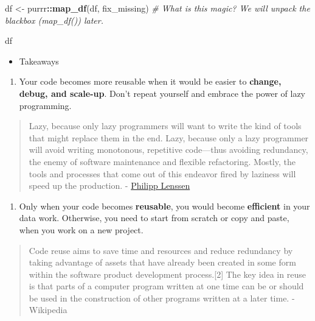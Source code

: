 \documentclass[
]{book}
\newenvironment{Shaded}{\begin{snugshade}}{\end{snugshade}}
\newcommand{\CommentTok}[1]{\textcolor[rgb]{0.56,0.35,0.01}{\textit{#1}}}
\newcommand{\FunctionTok}[1]{\textcolor[rgb]{0.13,0.29,0.53}{\textbf{#1}}}
\newcommand{\NormalTok}[1]{#1}
\newcommand{\OtherTok}[1]{\textcolor[rgb]{0.56,0.35,0.01}{#1}}
\newcommand{\SpecialCharTok}[1]{\textcolor[rgb]{0.81,0.36,0.00}{\textbf{#1}}}
\providecommand{\tightlist}{%
  \setlength{\itemsep}{0pt}\setlength{\parskip}{0pt}}
\begin{document}
\begin{Shaded}
\begin{Highlighting}[]
\NormalTok{df }\OtherTok{\textless{}{-}}\NormalTok{ purrr}\SpecialCharTok{::}\FunctionTok{map\_df}\NormalTok{(df, fix\_missing) }\CommentTok{\# What is this magic? We will unpack the blackbox (\textasciigrave{}map\_df()\textasciigrave{}) later.}

\NormalTok{df}
\end{Highlighting}
\end{Shaded}

\begin{itemize}
\tightlist
\item
  Takeaways
\end{itemize}

\begin{enumerate}
\def\labelenumi{\arabic{enumi}.}
\tightlist
\item
  Your code becomes more reusable when it would be easier to \textbf{change, debug, and scale-up}. Don't repeat yourself and embrace the power of lazy programming.
\end{enumerate}

\begin{quote}
Lazy, because only lazy programmers will want to write the kind of tools that might replace them in the end. Lazy, because only a lazy programmer will avoid writing monotonous, repetitive code---thus avoiding redundancy, the enemy of software maintenance and flexible refactoring. Mostly, the tools and processes that come out of this endeavor fired by laziness will speed up the production. - \href{http://blogoscoped.com/archive/2005-08-24-n14.html}{Philipp Lenssen}
\end{quote}

\begin{enumerate}
\def\labelenumi{\arabic{enumi}.}
\setcounter{enumi}{1}
\tightlist
\item
  Only when your code becomes \textbf{reusable}, you would become \textbf{efficient} in your data work. Otherwise, you need to start from scratch or copy and paste, when you work on a new project.
\end{enumerate}

\begin{quote}
Code reuse aims to save time and resources and reduce redundancy by taking advantage of assets that have already been created in some form within the software product development process.{[}2{]} The key idea in reuse is that parts of a computer program written at one time can be or should be used in the construction of other programs written at a later time. - Wikipedia
\end{quote}
\end{document}
